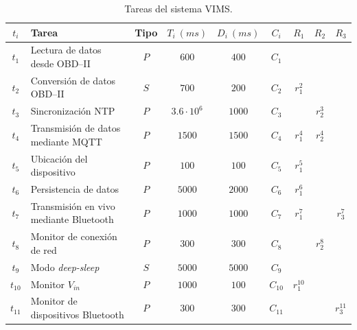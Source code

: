 \begin{table}[H]
  \centering
  \begin{tabularx}{\linewidth}{c|X|c|c|c|c|c|c|c}
    $t_i$    & \textbf{Tarea}                         & \textbf{Tipo} & $T_i~\left(ms\right)$ & $D_i~\left(ms\right)$ & $C_i$    & $R_1$      & $R_2$   & $R_3$      \\
    \hline\hline
    $t_{1}$  & Lectura de datos desde \ac{OBD}--II    & $P$           & $600$                 & $400$                 & $C_1$    &            &         &            \\
    $t_{2}$  & Conversión de datos \ac{OBD}--II       & $S$           & $700$                 & $200$                 & $C_2$    & $r^2_1$    &         &            \\
    $t_{3}$  & Sincronización NTP                     & $P$           & $3.6 \cdot 10^6$      & $1000$                & $C_3$    &            & $r^3_2$ &            \\
    $t_{4}$  & Transmisión de datos mediante MQTT     & $P$           & $1500$                & $1500$                & $C_4$    & $r^4_1$    & $r^4_2$ &            \\
    $t_{5}$  & Ubicación del dispositivo              & $P$           & $100$                 & $100$                 & $C_5$    & $r^5_1$    &         &            \\
    $t_{6}$  & Persistencia de datos                  & $P$           & $5000$                & $2000$                & $C_6$    & $r^6_1$    &         &            \\
    $t_{7}$  & Transmisión en vivo mediante Bluetooth & $P$           & $1000$                & $1000$                & $C_7$    & $r^7_1$    &         & $r^7_3$    \\
    $t_{8}$  & Monitor de conexión de red             & $P$           & $300$                 & $300$                 & $C_8$    &            & $r^8_2$ &            \\
    $t_{9}$  & Modo \textit{deep-sleep}               & $S$           & $5000$                & $5000$                & $C_9$    &            &         &            \\
    $t_{10}$ & Monitor $V_{in}$                       & $P$           & $1000$                & $100$                 & $C_{10}$ & $r^{10}_1$ &         &            \\
    $t_{11}$ & Monitor de dispositivos Bluetooth      & $P$           & $300$                 & $300$                 & $C_{11}$ &            &         & $r^{11}_3$ \\
    \hline
  \end{tabularx}
  \caption{Tareas del sistema \ac{VIMS}.}
  \label{tab:rt-table}
\end{table}

